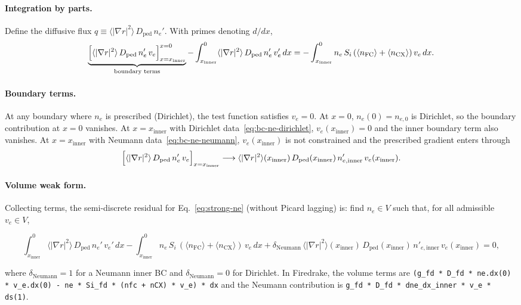 \paragraph{Integration by parts.}
Define the diffusive flux
$q \equiv \langle|\nabla r|^{2}\rangle\,D_{\mathrm{ped}}\,n_e'$.
With primes denoting $d/dx$,
\begin{equation}
  \underbrace{\Bigl[\langle|\nabla r|^{2}\rangle\,D_{\mathrm{ped}}\,n_e'\, v_e\Bigr]_{x=x_{\mathrm{inner}}}^{x=0}}_{\text{boundary terms}}
  - \int_{x_{\mathrm{inner}}}^{0} \langle|\nabla r|^{2}\rangle\,D_{\mathrm{ped}}\,n_e'\, v_e' \, dx
  = -\int_{x_{\mathrm{inner}}}^{0} n_e\,S_i\,(\langle n_{\mathrm{FC}}\rangle + \langle n_{\mathrm{CX}}\rangle)\, v_e \, dx.
  \label{eq:ne-ibp}
\end{equation}

\paragraph{Boundary terms.}
At any boundary where $n_e$ is prescribed (Dirichlet), the test function
satisfies $v_e=0$.
At $x=0$, $n_e(0)=n_{e,0}$ is Dirichlet, so the boundary contribution at
$x=0$ vanishes.
At $x=x_{\mathrm{inner}}$ with Dirichlet data~\eqref{eq:bc-ne-dirichlet},
$v_e(x_{\mathrm{inner}})=0$ and the inner boundary term also vanishes.
At $x=x_{\mathrm{inner}}$ with Neumann data~\eqref{eq:bc-ne-neumann},
$v_e(x_{\mathrm{inner}})$ is not constrained and the prescribed gradient
enters through
\begin{equation}
  \Bigl[\langle|\nabla r|^{2}\rangle\,D_{\mathrm{ped}}\,n_e'\, v_e\Bigr]_{x=x_{\mathrm{inner}}}
  \longrightarrow
  \langle|\nabla r|^{2}\rangle(x_{\mathrm{inner}})\,D_{\mathrm{ped}}(x_{\mathrm{inner}})\,n'_{e,\mathrm{inner}}\, v_e(x_{\mathrm{inner}}).
  \label{eq:ne-neumann-natural}
\end{equation}

\paragraph{Volume weak form.}
Collecting terms, the semi-discrete residual for Eq.~\eqref{eq:strong-ne}
(without Picard lagging) is: find $n_e \in V$ such that, for all admissible
$v_e \in V$,
\begin{widetext}
\begin{equation}
  \int_{x_{\mathrm{inner}}}^{0} \langle|\nabla r|^{2}\rangle\,D_{\mathrm{ped}}\,n_e'\, v_e' \, dx
  - \int_{x_{\mathrm{inner}}}^{0} n_e\,S_i\,(\langle n_{\mathrm{FC}}\rangle + \langle n_{\mathrm{CX}}\rangle)\, v_e \, dx
  + \delta_{\mathrm{Neumann}}\,
    \langle|\nabla r|^{2}\rangle(x_{\mathrm{inner}})\,D_{\mathrm{ped}}(x_{\mathrm{inner}})\,n'_{e,\mathrm{inner}}\, v_e(x_{\mathrm{inner}})
  = 0,
  \label{eq:weak-ne}
\end{equation}
\end{widetext}
where $\delta_{\mathrm{Neumann}}=1$ for a Neumann inner BC and
$\delta_{\mathrm{Neumann}}=0$ for Dirichlet.
In Firedrake, the volume terms are
\texttt{(g\_fd * D\_fd * ne.dx(0) * v\_e.dx(0) - ne * Si\_fd * (nfc + nCX) * v\_e) * dx}
and the Neumann contribution is
\texttt{g\_fd * D\_fd * dne\_dx\_inner * v\_e * ds(1)}.

